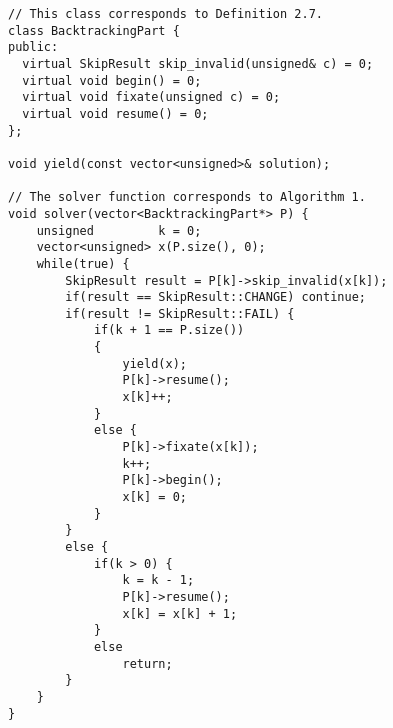 \begin{lstlisting}[language=MyCpp,
                   label={cppsolver},caption=
  {Complete C++ implementation of \Cref{backtrackalg}:
    The if-else statements in lines 19--41 precisely correspond to those
    in lines 5--17 of that algorithm.
    The \texttt{BacktrackingPart} objects iterate over $\protect{B_k[C](M,x)}$ via the
    \texttt{skip\_invalid} method.
    The remaining member function calls in lines
    $\text{23},\text{27},\text{29},\text{36}$ precompute structures that are
    used in \texttt{skip\_invalid} for quick evaluation.}]
// This class corresponds to Definition 2.7.
class BacktrackingPart {
public:
  virtual SkipResult skip_invalid(unsigned& c) = 0;
  virtual void begin() = 0;
  virtual void fixate(unsigned c) = 0;
  virtual void resume() = 0;
};

void yield(const vector<unsigned>& solution);

// The solver function corresponds to Algorithm 1.
void solver(vector<BacktrackingPart*> P) {
    unsigned         k = 0;
    vector<unsigned> x(P.size(), 0);
    while(true) {
        SkipResult result = P[k]->skip_invalid(x[k]);
        if(result == SkipResult::CHANGE) continue;
        if(result != SkipResult::FAIL) {
            if(k + 1 == P.size())
            {
                yield(x);
                P[k]->resume();
                x[k]++;
            }
            else {
                P[k]->fixate(x[k]);
                k++;
                P[k]->begin();
                x[k] = 0;
            }
        }
        else {
            if(k > 0) {
                k = k - 1;
                P[k]->resume();
                x[k] = x[k] + 1;
            }
            else
                return;
        }
    }
}
\end{lstlisting}
